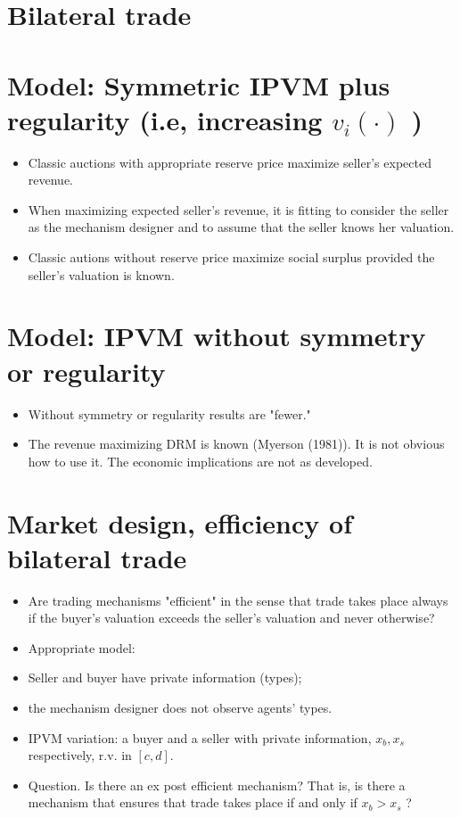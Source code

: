 \documentclass[10pt]{article}
\begin{document}
\section*{Bilateral trade}
\section*{Model: Symmetric IPVM plus regularity (i.e, increasing $v_{i}(\cdot)$ )}
\begin{itemize}
  \item Classic auctions with appropriate reserve price maximize seller's expected revenue.
  \item When maximizing expected seller's revenue, it is fitting to consider the seller as the mechanism designer and to assume that the seller knows her valuation.
  \item Classic autions without reserve price maximize social surplus provided the seller's valuation is known.
\end{itemize}

\section*{Model: IPVM without symmetry or regularity}
\begin{itemize}
  \item Without symmetry or regularity results are "fewer."
  \item The revenue maximizing DRM is known (Myerson (1981)). It is not obvious how to use it. The economic implications are not as developed.
\end{itemize}

\section*{Market design, efficiency of bilateral trade}
\begin{itemize}
  \item Are trading mechanisms "efficient" in the sense that trade takes place always if the buyer's valuation exceeds the seller's valuation and never otherwise?
  \item Appropriate model:
  \item Seller and buyer have private information (types);
  \item the mechanism designer does not observe agents' types.
  \item IPVM variation: a buyer and a seller with private information, $x_{b}, x_{s}$ respectively, r.v. in $[c, d]$.
  \item Question. Is there an ex post efficient mechanism? That is, is there a mechanism that ensures that trade takes place if and only if $x_{b}>x_{s}$ ?
\end{itemize}
\end{document}
